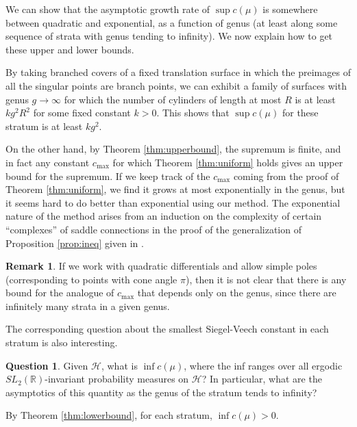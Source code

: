 \documentclass{article}
\theoremstyle{definition}
\newtheorem{rmk}{Remark}[section]
\newtheorem{question}{Question}[section]
\begin{document}
We can show that the asymptotic growth rate of $\sup c(\mu)$ is somewhere between quadratic and exponential, as a function of genus (at least along some sequence of strata with genus tending to infinity).  We now explain how to get these upper and lower bounds. 

By taking branched covers of a fixed translation surface in which the preimages of all the singular points are branch points, we can exhibit a family of surfaces with genus $g\to\infty$ for which the number of cylinders of length at most $R$ is at least $kg^2R^2$ for some fixed constant $k>0$.  This shows that $\sup c(\mu)$ for these stratum is at least $kg^2$.  

On the other hand, by Theorem \ref{thm:upperbound}, the supremum is finite, and in fact any constant $c_{\max}$ for which Theorem \ref{thm:uniform} holds gives an upper bound for the supremum.   If we keep track of the $c_{\max}$ coming from the proof of Theorem \ref{thm:uniform}, we find it grows at most exponentially in the genus, but it seems hard to do better than exponential using our method.   The exponential nature of the method arises from an induction on the complexity of certain ``complexes'' of saddle connections in the proof of the generalization of Proposition \ref{prop:ineq} given in \cite{dozier2017}.  


\begin{rmk}
If we work with quadratic differentials and allow simple poles (corresponding to points with cone angle $\pi$), then it is not clear that there is any bound for the analogue of $c_{\max}$ that depends only on the genus, since there are infinitely many strata in a given genus. 
\end{rmk}

The corresponding question about the smallest Siegel-Veech constant in each stratum is also interesting. 

\begin{question}
  Given $\mathcal{H}$, what is $\inf c(\mu)$, where the inf ranges over all ergodic $SL_2(\mathbb{R})$-invariant probability measures on $\mathcal{H}$?  In particular, what are the asymptotics of this quantity as the genus of the stratum tends to infinity?  
\end{question}

By Theorem \ref{thm:lowerbound}, for each stratum, $\inf c(\mu) >0$.    

{}

\end{document}
